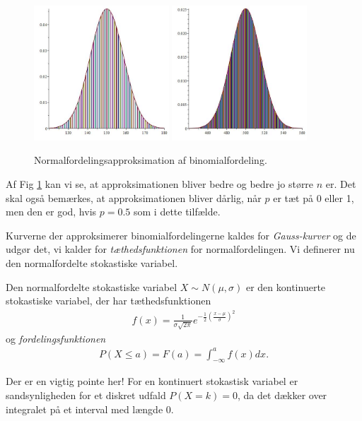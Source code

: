 \begin{exa}
\begin{figure}[H]
		\includegraphics[width=0.45\textwidth]{Billeder/binompinde300}
		\includegraphics[width=0.45\textwidth]{Billeder/binompinde1000}
		\caption{Normalfordelingsapproksimation af binomialfordeling.}
		\label{fig:pinde4}
	\end{figure}
	Af Fig \ref{fig:pinde4} kan vi se, at approksimationen bliver bedre og bedre jo større $n$ er. Det skal også bemærkes, at approksimationen bliver dårlig, når $p$ er tæt på 0 eller 1, men den er god, 
	hvis $p = 0.5$ som i dette tilfælde. 
\end{exa}

Kurverne der approksimerer binomialfordelingerne kaldes for \textit{Gauss-kurver} og de udgør det, vi kalder for \textit{tæthedsfunktionen} for normalfordelingen. Vi definerer nu den normalfordelte stokastiske variabel.

\begin{defn}
	Den normalfordelte stokastiske variabel $X \sim N(\mu,\sigma)$ er den kontinuerte stokastiske variabel, der har tæthedsfunktionen
	\begin{align*}
		f(x) = \frac{1}{\sigma \sqrt{2\pi}}e^{-\frac{1}{2}\left(\frac{x-\mu}{\sigma}\right)^2}
	\end{align*}
	og \textit{fordelingsfunktionen}
	\begin{align*}
		P(X\leq a) = F(a) = \int_{-\infty}^a f(x) dx.
	\end{align*}
\end{defn}
Der er en vigtig pointe her! For en kontinuert stokastisk variabel er sandsynligheden for et diskret udfald $P(X=k) = 0$, da det dækker over integralet på et interval med længde 0.

